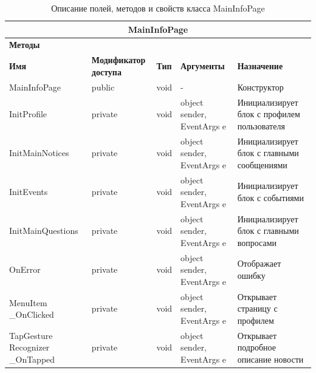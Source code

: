 \documentclass{../includes/TechDoc}
\begin{document}
    \begin{table}[ht]
        \caption{\label{tab:class-maininfopage-table}Описание полей, методов и свойств класса MainInfoPage}
        \centering
        \begin{tabular}{|p{3.2cm}|p{3cm}|p{2.9cm}|p{2.9cm}|p{4cm}|}
            \hline
            \multicolumn{5}{|c|}{MainInfoPage} \\ \hline
            \multicolumn{5}{|l|}{\textbf{Методы}} \\ \hline
            \textbf{Имя} & \textbf{Модификатор доступа} & \textbf{Тип} & \textbf{Аргументы} & \textbf{Назначение} \\ \hline
            MainInfoPage & public & void & - & Конструктор \\ \hline
            InitProfile & private & void & object sender, EventArgs e & Инициализирует блок с профилем пользователя \\ \hline
            InitMainNotices & private & void & object sender, EventArgs e & Инициализирует блок с главными сообщениями \\ \hline
            InitEvents & private & void & object sender, EventArgs e & Инициализирует блок с событиями \\ \hline
            InitMainQuestions & private & void & object sender, EventArgs e & Инициализирует блок с главными вопросами \\ \hline
            OnError & private & void & object sender, EventArgs e & Отображает ошибку \\ \hline
            MenuItem \_OnClicked & private & void & object sender, EventArgs e & Открывает страницу с профилем \\ \hline
            TapGesture Recognizer \_OnTapped & private & void & object sender, EventArgs e & Открывает подробное описание новости \\ \hline
        \end{tabular}
    \end{table}
\end{document}
